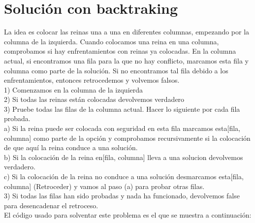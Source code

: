 	\section[Solución con backtraking]{Solución con backtraking}
	
	La idea es colocar las reinas una a una en diferentes columnas, empezando por la columna de la izquierda. Cuando colocamos una reina en una columna, comprobamos si hay enfrentamientos con reinas ya colocadas. En la columna actual, si encontramos una fila para la que no hay conflicto, marcamos esta fila y columna como parte de la solución. Si no encontramos tal fila debido a los enfrentamientos, entonces retrocedemos y volvemos falsos. \\
	
	1) Comenzamos en la columna de la izquierda  \\
	2) Si todas las reinas están colocadas devolvemos verdadero \\
	3) Pruebe todas las filas de la columna actual.  Hacer lo siguiente	por cada fila probada. \\
	a) Si la reina puede ser colocada con seguridad en esta fila
	marcamos esta[fila, columna] como parte de la opción 
	y comprobamos recursivamente si la colocación de  
	que aquí la reina conduce a una solución. \\
	b) Si la colocación de la reina en[fila, columna] lleva a una
	solucion devolvemos verdadero.\\
	c) Si la colocación de la reina no conduce a una solución 
	desmarcamos esta[fila, columna] (Retroceder) 
	y vamos al paso (a) para probar otras filas.\\
	3) Si todas las filas han sido probadas y nada ha funcionado, 
	devolvemos false para desencadenar el retroceso.\\
	
	El código usado para solventar este problema es el que se muestra a continuación: \\
	
